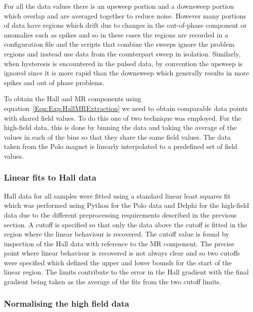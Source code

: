For all the data values there is an upsweep portion and a downsweep portion which overlap and are averaged together to reduce noise. However many portions of data have regions which drift due to changes in the out-of-phase component or anomalies such as spikes and so in these cases the regions are recorded in a configuration file and the scripts that combine the sweeps ignore the problem regions and instead use data from the counterpart sweep in isolation. Similarly, when hysteresis is encountered in the pulsed data, by convention the upsweep is ignored since it is more rapid than the downsweep which generally results in more spikes and out of phase problems.

To obtain the Hall and \ac{MR} components using equation~\ref{Eqn:Exp:HallMRExtraction} we need to obtain comparable data points with shared field values. To do this one of two technique was employed. For the high-field data, this is done by binning the data and taking the average of the values in each of the bins so that they share the same field values. The data taken from the Polo magnet is linearly interpolated to a predefined set of field values.

\subsubsection{Linear fits to Hall data}

Hall data for all samples were fitted using a standard linear least squares fit which was performed using Python for the Polo data and Delphi for the high-field data due to the different preprocessing requirements described in the previous section. A cutoff is specified so that only the data above the cutoff is fitted in the region where the linear behaviour is recovered. The cutoff value is found by inspection of the Hall data with reference to the \ac{MR} component. The precise point where linear behaviour is recovered is not always clear and so two cutoffs were specified which defined the upper and lower bounds for the start of the linear region. The limits contribute to the error in the Hall gradient with the final gradient being taken as the average of the fits from the two cutoff limits.

\subsubsection{Normalising the high field data}

